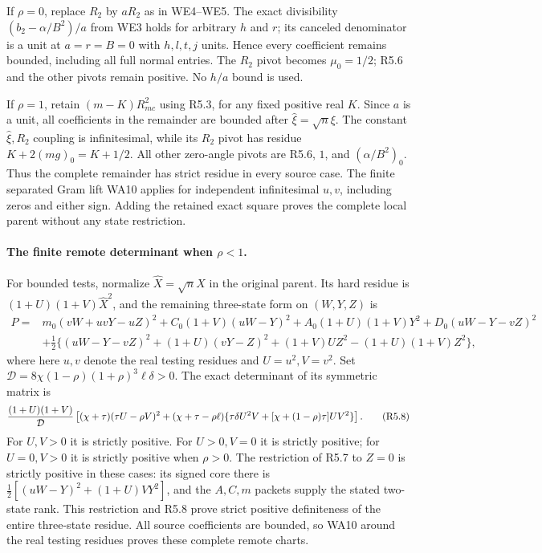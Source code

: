 If $\rho=0$, replace $R_2$ by $aR_2$ as in WE4--WE5.
The exact divisibility $(b_2-\alpha/B^2)/a$ from WE3 holds for arbitrary
$h$ and $r$; its canceled denominator is a unit at $a=r=B=0$ with
$h,l,t,j$ units. Hence every coefficient remains bounded, including
all full normal entries. The $R_2$ pivot becomes $\mu_0=1/2$;
R5.6 and the other pivots remain positive. No $h/a$ bound is used.

If $\rho=1$, retain $(m-K)R_{mc}^2$ using R5.3, for any fixed
positive real $K$. Since $a$ is a unit, all coefficients in the
remainder are bounded after $\widehat\xi=\sqrt n\xi$.
The constant $\widehat\xi,R_2$ coupling is infinitesimal, while
its $R_2$ pivot has residue $K+2(mg)_0=K+1/2$.
All other zero-angle pivots are R5.6, $1$, and $(\alpha/B^2)_0$.
Thus the complete remainder has strict residue in every source case.
The finite separated Gram lift WA10 applies for independent infinitesimal
$u,v$, including zeros and either sign. Adding the retained exact square
proves the complete local parent without any state restriction.

\paragraph{The finite remote determinant when $\rho<1$.}
For bounded tests, normalize $\widehat X=\sqrt nX$ in the original
parent. Its hard residue is $(1+U)(1+V)\widehat X^2$, and the remaining
three-state form on $(W,Y,Z)$ is
\[
\begin{split}
 P={}&m_0(vW+uvY-uZ)^2+C_0(1+V)(uW-Y)^2
   +A_0(1+U)(1+V)Y^2+D_0(uW-Y-vZ)^2\\
 &+\tfrac12\{(uW-Y-vZ)^2+(1+U)(vY-Z)^2
        +(1+V)U Z^2-(1+U)(1+V)Z^2\},                
\end{split}\tag{R5.7}
\]
where here $u,v$ denote the real testing residues and $U=u^2,V=v^2$.
Set
$\mathcal D=8\chi(1-\rho)(1+\rho)^3\ell\delta>0$.
The exact determinant of its symmetric matrix is
\[
 { (1+U)(1+V)\over\mathcal D}
 \left[(\chi+\tau)(\tau U-\rho V)^2
 +(\chi+\tau-\rho\ell)
 \{\tau\delta U^2V+[\chi+(1-\rho)\tau]UV^2\}\right]. \tag{R5.8}
\]
For $U,V>0$ it is strictly positive. For $U>0,V=0$ it is strictly
positive; for $U=0,V>0$ it is strictly positive when $\rho>0$.
The restriction of R5.7 to $Z=0$ is strictly positive in these cases:
its signed core there is
$\tfrac12[(uW-Y)^2+(1+U)VY^2]$, and the $A,C,m$ packets supply
the stated two-state rank. This restriction and R5.8 prove strict
positive definiteness of the entire three-state residue. All source
coefficients are bounded, so WA10 around the real testing residues
proves these complete remote charts.

